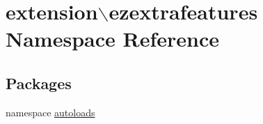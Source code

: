 \hypertarget{namespaceextension_1_1ezextrafeatures}{\section{extension$\backslash$ezextrafeatures Namespace Reference}
\label{namespaceextension_1_1ezextrafeatures}
}
\subsection*{Packages}
\begin{DoxyCompactItemize}
\item 
namespace \hyperlink{namespaceextension_1_1ezextrafeatures_1_1autoloads}{autoloads}
\end{DoxyCompactItemize}
